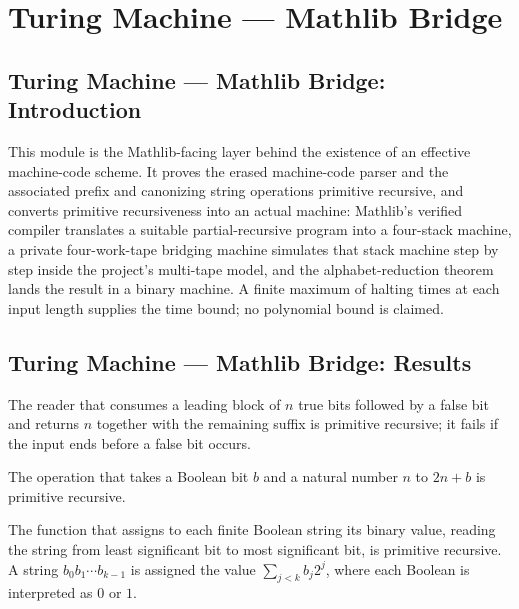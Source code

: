 \section{Turing Machine --- Mathlib Bridge}
\subsection*{Turing Machine --- Mathlib Bridge: Introduction}

This module is the Mathlib-facing layer behind the existence of an effective
machine-code scheme.  It proves the erased machine-code parser and the associated
prefix and canonizing string operations primitive recursive, and converts primitive
recursiveness into an actual machine: Mathlib's verified compiler translates a
suitable partial-recursive program into a four-stack machine, a private
four-work-tape bridging machine simulates that stack machine step by step inside
the project's multi-tape model, and the alphabet-reduction theorem lands the result
in a binary machine.  A finite maximum of halting times at each input length
supplies the time bound; no polynomial bound is claimed.

\subsection*{Turing Machine --- Mathlib Bridge: Results}

\begin{lemma}
\label{Turing.codePrimUnary}
\leanok
{}
The reader that consumes a leading block of $n$ true bits followed by a false bit and
returns $n$ together with the remaining suffix is primitive recursive; it fails if the
input ends before a false bit occurs.
\end{lemma}

\begin{lemma}
\label{Turing.codePrimBit}
\leanok
{}
The operation that takes a Boolean bit $b$ and a natural number $n$ to $2n+b$ is
primitive recursive.
\end{lemma}

\begin{lemma}
\label{Turing.codePrimBitsNat}
\leanok
{}
The function that assigns to each finite Boolean string its binary value, reading the
string from least significant bit to most significant bit, is primitive recursive. A
string $b_0b_1\cdots b_{k-1}$ is assigned the value $\sum_{j<k} b_j2^j$, where each
Boolean is interpreted as $0$ or $1$.
\end{lemma}

